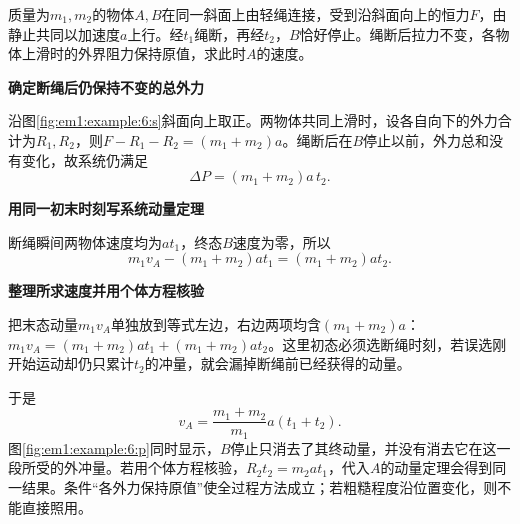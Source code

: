 \begin{question}\begin{example}[断绳后的整体动量]\label{em1:example:6}
质量为$m_1,m_2$的物体$A,B$在同一斜面上由轻绳连接，受到沿斜面向上的恒力$F$，由静止共同以加速度$a$上行。经$t_1$绳断，再经$t_2$，$B$恰好停止。绳断后拉力不变，各物体上滑时的外界阻力保持原值，求此时$A$的速度。
\end{example}
\end{question}
\begin{solution}\textbf{确定断绳后仍保持不变的总外力}\par\nobreak
沿图\ref{fig:em1:example:6:s}斜面向上取正。两物体共同上滑时，设各自向下的外力合计为$R_1,R_2$，则$F-R_1-R_2=(m_1+m_2)a$。绳断后在$B$停止以前，外力总和没有变化，故系统仍满足
\[\Delta P=(m_1+m_2)a\,t_2.\]


\par\medskip{}\noindent\textbf{用同一初末时刻写系统动量定理}\par\nobreak
断绳瞬间两物体速度均为$at_1$，终态$B$速度为零，所以
\[m_1v_A-(m_1+m_2)at_1=(m_1+m_2)at_2.\]



\par\medskip{}\noindent\textbf{整理所求速度并用个体方程核验}\par\nobreak
把末态动量$m_1v_A$单独放到等式左边，右边两项均含$(m_1+m_2)a$：$m_1v_A=(m_1+m_2)a t_1+(m_1+m_2)a t_2$。这里初态必须选断绳时刻，若误选刚开始运动却仍只累计$t_2$的冲量，就会漏掉断绳前已经获得的动量。

于是
\[\boxed{v_A=\frac{m_1+m_2}{m_1}a(t_1+t_2)}.\]
图\ref{fig:em1:example:6:p}同时显示，$B$停止只消去了其终动量，并没有消去它在这一段所受的外冲量。若用个体方程核验，$R_2t_2=m_2at_1$，代入$A$的动量定理会得到同一结果。条件“各外力保持原值”使全过程方法成立；若粗糙程度沿位置变化，则不能直接照用。\end{solution}
